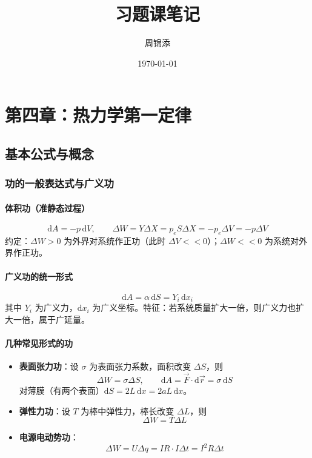 \documentclass[UTF8]{ctexart}
\title{习题课笔记}
\author{周锦添}
\date{\today}
\begin{document}
\maketitle
\tableofcontents
\newpage

\section{第四章：热力学第一定律}

\subsection{基本公式与概念}

\subsubsection{功的一般表达式与广义功}

\paragraph{体积功（准静态过程）}
\[
\mathrm{d}A = -p\,\mathrm{d}V,\qquad 
\Delta W = Y\Delta X = p_e S\Delta X = -p_e\Delta V = -p\Delta V
\]
约定：$\Delta W>0$ 为外界对系统作正功（此时 $\Delta V<<0$）；$\Delta W<<0$ 为系统对外界作正功。

\paragraph{广义功的统一形式}
\[
\mathrm{d}A = \alpha\,\mathrm{d}S = Y_i\,\mathrm{d}x_i
\]
其中 $Y_i$ 为广义力，$\mathrm{d}x_i$ 为广义坐标。特征：若系统质量扩大一倍，则广义力也扩大一倍，属于广延量。

\paragraph{几种常见形式的功}
\begin{itemize}[leftmargin=2em]
  \item \textbf{表面张力功}：设 $\sigma$ 为表面张力系数，面积改变 $\Delta S$，则
  \[
  \Delta W = \sigma\Delta S,\qquad \mathrm{d}A = \vec{F}\cdot\mathrm{d}\vec{r}=\sigma\,\mathrm{d}S
  \]
  对薄膜（有两个表面）$\mathrm{d}S=2L\,\mathrm{d}x=2aL\,\mathrm{d}x$。
  
  \item \textbf{弹性力功}：设 $T$ 为棒中弹性力，棒长改变 $\Delta L$，则
  \[
  \Delta W = T\Delta L
  \]
  
  \item \textbf{电源电动势功}：
  \[
  \Delta W = U\Delta q = IR\cdot I\Delta t = I^2R\Delta t
  \]
\end{itemize}
\end{document}
